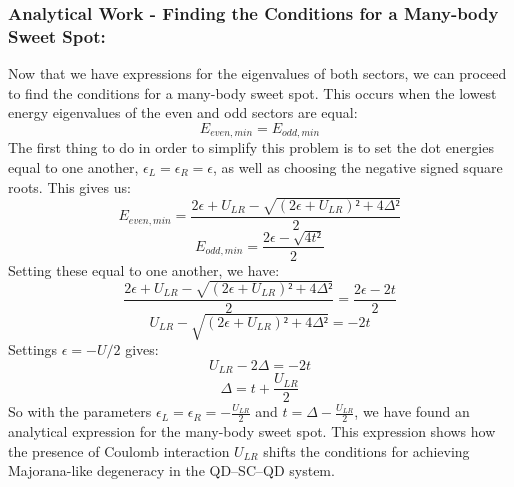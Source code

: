 \documentclass[11pt, letterpaper, titlepage]{article}
\begin{document}
\subsubsection{Analytical Work - Finding the Conditions for a Many-body Sweet Spot:}
Now that we have expressions for the eigenvalues of both sectors, we can proceed to find the conditions for a many-body sweet spot. This occurs when the lowest energy eigenvalues of the even and odd sectors are equal:
$$E_{even,min} = E_{odd,min}$$
The first thing to do in order to simplify this problem is to set the dot energies equal to one another, $ϵ_L = ϵ_R = ϵ$, as well as choosing the negative signed square roots. This gives us:
$$E_{even,min} = \frac{2ϵ + U_{LR} - \sqrt{(2ϵ + U_{LR})² + 4Δ²}}{2}$$
$$E_{odd,min} = \frac{2ϵ - \sqrt{4t²}}{2}$$
Setting these equal to one another, we have:
$$\frac{2ϵ + U_{LR} - \sqrt{(2ϵ + U_{LR})² + 4Δ²}}{2} = \frac{2ϵ - 2t}{2}$$
$$U_{LR} - \sqrt{(2ϵ + U_{LR})² + 4Δ²} = -2t$$
Settings $\epsilon= -U/2$ gives:
$$U_{LR} - 2Δ = -2t$$
$$Δ = t + \frac{U_{LR}}{2}$$
So with the parameters $ϵ_L = ϵ_R = -\frac{U_{LR}}{2}$ and $t = Δ - \frac{U_{LR}}{2}$, we have found an analytical expression for the many-body sweet spot. This expression shows how the presence of Coulomb interaction $U_{LR}$ shifts the conditions for achieving Majorana-like degeneracy in the QD–SC–QD system.
\end{document}
